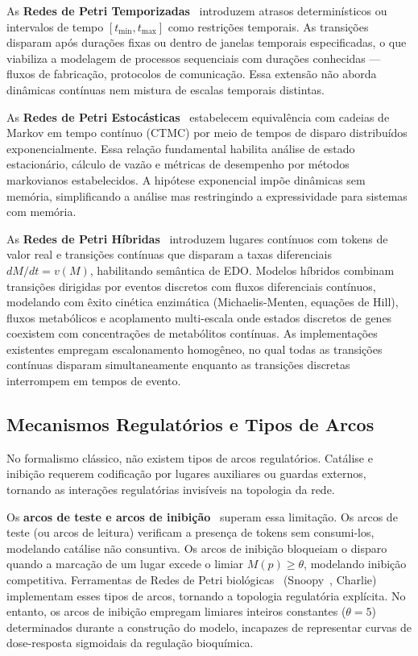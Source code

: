 As \textbf{Redes de Petri Temporizadas}~\parencite{Ramchandani1974,Merlin1974}
introduzem atrasos determinísticos ou intervalos de tempo $[t_{\min}, t_{\max}]$
como restrições temporais. As transições disparam após durações fixas ou dentro
de janelas temporais especificadas, o que viabiliza a modelagem de processos
sequenciais com durações conhecidas --- fluxos de fabricação, protocolos de
comunicação. Essa extensão não aborda dinâmicas contínuas nem mistura de escalas
temporais distintas.

As \textbf{Redes de Petri Estocásticas}~\cite{Gillespie1977,Gibson2000,Goss1998} estabelecem
equivalência com cadeias de Markov em tempo contínuo (CTMC) por meio de tempos
de disparo distribuídos exponencialmente. Essa relação fundamental habilita
análise de estado estacionário, cálculo de vazão e métricas de desempenho por
métodos markovianos estabelecidos. A hipótese exponencial impõe dinâmicas sem
memória, simplificando a análise mas restringindo a expressividade para sistemas
com memória.

As \textbf{Redes de Petri Híbridas}~\cite{David1992} introduzem lugares contínuos
com tokens de valor real e transições contínuas que disparam a taxas diferenciais
$dM/dt = v(M)$, habilitando semântica de EDO. Modelos híbridos combinam
transições dirigidas por eventos discretos com fluxos diferenciais contínuos,
modelando com êxito cinética enzimática (Michaelis-Menten, equações de Hill),
fluxos metabólicos e acoplamento multi-escala onde estados discretos de genes
coexistem com concentrações de metabólitos contínuas. As implementações
existentes empregam escalonamento homogêneo, no qual todas as transições contínuas
disparam simultaneamente enquanto as transições discretas interrompem em tempos
de evento.

\subsection{Mecanismos Regulatórios e Tipos de Arcos}
\label{subsec:regulacao}

No formalismo clássico, não existem tipos de arcos regulatórios. Catálise e
inibição requerem codificação por lugares auxiliares ou guardas externos, tornando
as interações regulatórias invisíveis na topologia da rede.

Os \textbf{arcos de teste e arcos de inibição}~\cite{Koch2011,Heiner2008}
superam essa limitação. Os arcos de teste (ou arcos de leitura) verificam a
presença de tokens sem consumi-los, modelando catálise não consuntiva. Os arcos
de inibição bloqueiam o disparo quando a marcação de um lugar excede o limiar
$M(p) \geq \theta$, modelando inibição competitiva. Ferramentas de Redes de
Petri biológicas~\cite{Chaouiya2007} (Snoopy~\cite{Koch2011}, Charlie) implementam esses tipos de
arcos, tornando a topologia regulatória explícita. No entanto, os arcos de
inibição empregam limiares inteiros constantes ($\theta = 5$) determinados
durante a construção do modelo, incapazes de representar curvas de dose-resposta
sigmoidais da regulação bioquímica.

